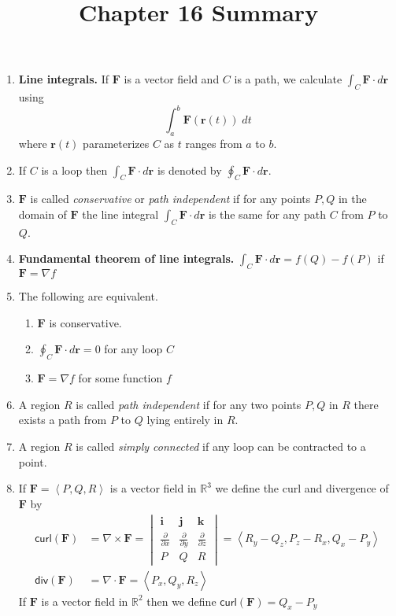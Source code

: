 \documentclass[12pt]{article}
\title{Chapter 16 Summary}
\author{}\date{}
\begin{document}
\maketitle
\thispagestyle{empty}

\begin{enumerate}
\item{\bf Line integrals.}
If $\mathbold{F}$ is a vector field and
$C$ is a path, we calculate $\int_C\mathbold{F}\cdot d\mathbold{r}$ using
\[\int_a^b\mathbold{F}\left(\mathbold{r}\left(t\right)\right)\;dt\]
where $\mathbold{r}\left(t\right)$ parameterizes $C$
as $t$ ranges from $a$ to $b$.

\item If $C$ is a loop then
$\int_C\mathbold{F}\cdot d\mathbold{r}$
is denoted by
$\oint_C\mathbold{F}\cdot d\mathbold{r}$.

\item $\mathbold{F}$ is called {\em conservative} or {\em
path independent} if for any points $P,Q$ in the domain of $\mathbold{F}$
the line integral
$\int_C\mathbold{F}\cdot d\mathbold{r}$ is the same for any
path $C$ from $P$ to $Q$.

\item{\bf Fundamental theorem of line integrals.}
$\int_C\mathbold{F}\cdot d\mathbold{r}=f\left(Q\right)-f\left(P\right)$
if $\mathbold{F}=\nabla f$
\item The following are equivalent.
\begin{enumerate}
\item $\mathbold{F}$ is conservative.
\item $\oint_C\mathbold{F}\cdot d\mathbold{r}=0$
for any loop $C$
\item $\mathbold{F}=\nabla f$ for some function $f$
\end{enumerate}

\item A region $R$ is called {\em path independent}
if for any two points $P,Q$ in $R$ there exists
a path from $P$ to $Q$ lying entirely in $R$.

\item A region $R$ is called {\em simply connected}
if any loop can be contracted to a point.

\item If $\mathbold{F}=\left\langle P,Q,R\right\rangle$
is a vector field in $\mathbb{R}^3$
we define the curl and divergence of $\mathbold{F}$ by
\begin{align*}
\mathsf{curl}\left(\mathbold{F}\right)
&=\nabla\times\mathbold{F}
=\begin{vmatrix}
\mathbold{i}&\mathbold{j}&\mathbold{k}\\
\frac{\partial}{\partial x}&\frac{\partial}{\partial y}
&\frac{\partial}{\partial z}\\P&Q&R 
\end{vmatrix}
=\left\langle R_y-Q_z,P_z-R_x,Q_x-P_y\right\rangle\\
\mathsf{div}\left(\mathbold{F}\right)
&=\nabla\cdot\mathbold{F}=\left\langle P_x,Q_y,R_z\right\rangle
\end{align*}
If $\mathbold{F}$ is a vector field in $\mathbb{R}^2$
then we define
$\mathsf{curl}\left(\mathbold{F}\right)
=Q_x-P_y$


\end{enumerate}
\end{document}
